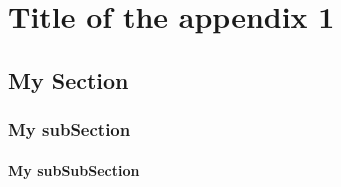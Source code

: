\chapter{Title of the appendix 1}
\label{chap:appendix1}





\section{My Section}
\label{sec:appendix1_mySection}



\subsection{My subSection}

\subsubsection{My subSubSection}


